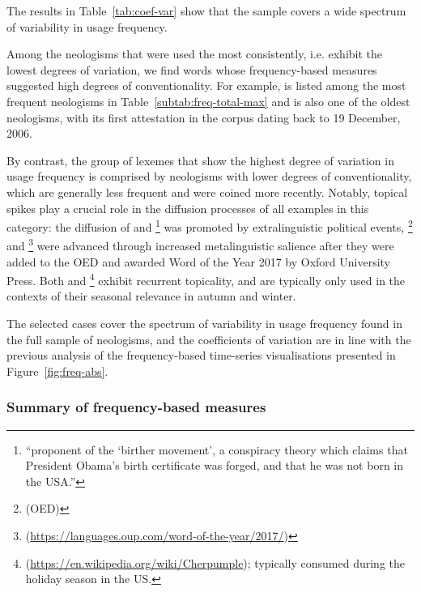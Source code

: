 \documentclass[
  a4paper,
  abstract=on,
  captions=tableabove
  ]{scrartcl}
\begin{document}
      The results in Table~\ref{tab:coef-var} show that the sample covers a wide spectrum of variability in usage frequency.

      Among the neologisms that were used the most consistently, i.e. exhibit the lowest degrees of variation, we find words whose frequency-based measures suggested high degrees of conventionality. For example,  is listed among the most frequent neologisms in Table~\ref{subtab:freq-total-max} and is also one of the oldest neologisms, with its first attestation in the corpus dating back to 19 December, 2006.

      By contrast, the group of lexemes that show the highest degree of variation in usage frequency is comprised by neologisms with lower degrees of conventionality, which are generally less frequent and were coined more recently. Notably, topical spikes play a crucial role in the diffusion processes of all examples in this category: the diffusion of  and \footnote{\enquote{proponent of the \enquote{birther movement}, a conspiracy theory which claims that President Obama's birth certificate was forged, and that he was not born in the USA.}} was promoted by extralinguistic political events, \footnote{ (OED)} and \footnote{ (\url{https://languages.oup.com/word-of-the-year/2017/})} were advanced through increased metalinguistic salience after they were added to the OED and awarded Word of the Year 2017 by Oxford University Press. Both  and \footnote{ (\url{https://en.wikipedia.org/wiki/Cherpumple}); typically consumed during the holiday season in the US.} exhibit recurrent topicality, and are typically only used in the contexts of their seasonal relevance in autumn and winter.

      The selected cases cover the spectrum of variability in usage frequency found in the full sample of neologisms, and the coefficients of variation are in line with the previous analysis of the frequency-based time-series visualisations presented in Figure~\ref{fig:freq-abs}.


      \subsubsection{Summary of frequency-based measures}
\end{document}
